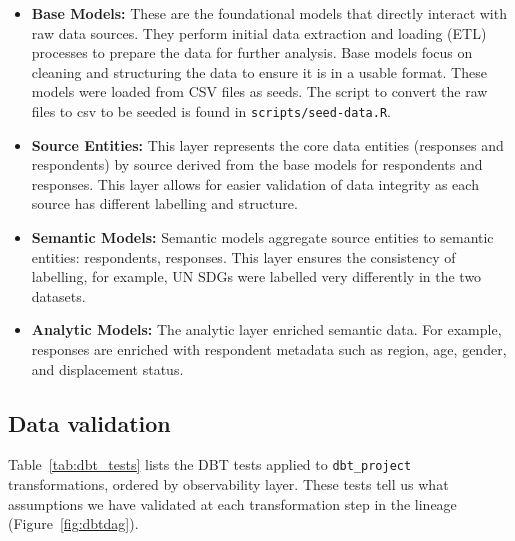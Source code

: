 \documentclass{article}
\begin{document}
\begin{itemize}
    \item \textbf{Base Models:} These are the foundational models that directly interact with raw data sources. They perform initial data extraction and loading (ETL) processes to prepare the data for further analysis. Base models focus on cleaning and structuring the data to ensure it is in a usable format. These models were loaded from CSV files as seeds. The script to convert the raw files to csv to be seeded is found in \texttt{scripts/seed-data.R}.

    \item \textbf{Source Entities:} This layer represents the core data entities (responses and respondents) by source derived from the base models for respondents and responses. This layer allows for easier validation of data integrity as each source has different labelling and structure.
    
    \item \textbf{Semantic Models:} Semantic models aggregate source entities to semantic entities: respondents, responses. This layer ensures the consistency of labelling, for example, UN SDGs were labelled very differently in the two datasets.
    
    \item \textbf{Analytic Models:} The analytic layer enriched semantic data. For example, responses are enriched with respondent metadata such as region, age, gender, and displacement status. 
\end{itemize}

\subsection{Data validation}

Table~\ref{tab:dbt_tests} lists the DBT tests applied to \texttt{dbt\_project} transformations, ordered by observability layer. These tests tell us what assumptions we have validated at each transformation step in the lineage (Figure~\ref{fig:dbtdag}).


\end{document}
